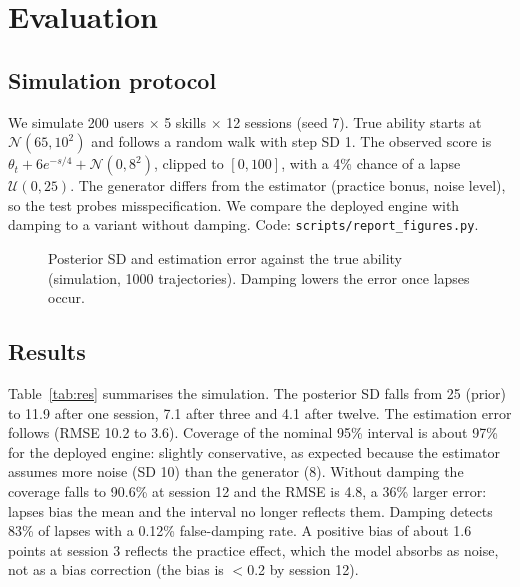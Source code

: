 \documentclass[conference]{IEEEtran}
\begin{document}
\section{Evaluation}\label{sec:eval}
\subsection{Simulation protocol}
We simulate 200 users $\times$ 5 skills $\times$ 12 sessions (seed 7). True ability starts at $\mathcal N(65,10^2)$ and follows a random walk with step SD 1. The observed score is $\theta_t+6e^{-s/4}+\mathcal N(0,8^2)$, clipped to $[0,100]$, with a 4\% chance of a lapse $\mathcal U(0,25)$. The generator differs from the estimator (practice bonus, noise level), so the test probes misspecification. We compare the deployed engine with damping to a variant without damping. Code: \texttt{scripts/report\_figures.py}.

\begin{figure}[t]
\centering
{}
\caption{Posterior SD and estimation error against the true ability (simulation, 1000 trajectories). Damping lowers the error once lapses occur.}
\label{fig:conv}
\end{figure}

\subsection{Results}
Table~\ref{tab:res} summarises the simulation. The posterior SD falls from 25 (prior) to 11.9 after one session, 7.1 after three and 4.1 after twelve. The estimation error follows (RMSE 10.2 to 3.6). Coverage of the nominal 95\% interval is about 97\% for the deployed engine: slightly conservative, as expected because the estimator assumes more noise (SD 10) than the generator (8). Without damping the coverage falls to 90.6\% at session 12 and the RMSE is 4.8, a 36\% larger error: lapses bias the mean and the interval no longer reflects them. Damping detects 83\% of lapses with a 0.12\% false-damping rate. A positive bias of about 1.6 points at session 3 reflects the practice effect, which the model absorbs as noise, not as a bias correction (the bias is $<$0.2 by session 12).
\end{document}
